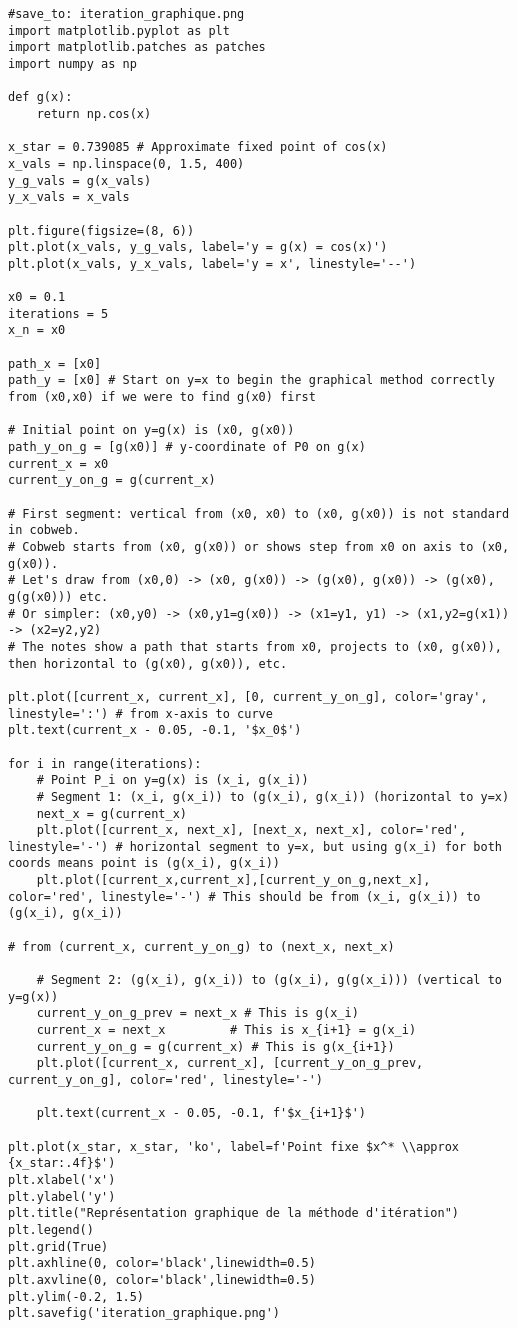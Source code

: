 \begin{verbatim}
#save_to: iteration_graphique.png
import matplotlib.pyplot as plt
import matplotlib.patches as patches
import numpy as np

def g(x):
    return np.cos(x)

x_star = 0.739085 # Approximate fixed point of cos(x)
x_vals = np.linspace(0, 1.5, 400)
y_g_vals = g(x_vals)
y_x_vals = x_vals

plt.figure(figsize=(8, 6))
plt.plot(x_vals, y_g_vals, label='y = g(x) = cos(x)')
plt.plot(x_vals, y_x_vals, label='y = x', linestyle='--')

x0 = 0.1
iterations = 5
x_n = x0

path_x = [x0]
path_y = [x0] # Start on y=x to begin the graphical method correctly from (x0,x0) if we were to find g(x0) first

# Initial point on y=g(x) is (x0, g(x0))
path_y_on_g = [g(x0)] # y-coordinate of P0 on g(x)
current_x = x0
current_y_on_g = g(current_x)

# First segment: vertical from (x0, x0) to (x0, g(x0)) is not standard in cobweb.
# Cobweb starts from (x0, g(x0)) or shows step from x0 on axis to (x0, g(x0)).
# Let's draw from (x0,0) -> (x0, g(x0)) -> (g(x0), g(x0)) -> (g(x0), g(g(x0))) etc.
# Or simpler: (x0,y0) -> (x0,y1=g(x0)) -> (x1=y1, y1) -> (x1,y2=g(x1)) -> (x2=y2,y2)
# The notes show a path that starts from x0, projects to (x0, g(x0)), then horizontal to (g(x0), g(x0)), etc.

plt.plot([current_x, current_x], [0, current_y_on_g], color='gray', linestyle=':') # from x-axis to curve
plt.text(current_x - 0.05, -0.1, '$x_0$')

for i in range(iterations):
    # Point P_i on y=g(x) is (x_i, g(x_i))
    # Segment 1: (x_i, g(x_i)) to (g(x_i), g(x_i)) (horizontal to y=x)
    next_x = g(current_x)
    plt.plot([current_x, next_x], [next_x, next_x], color='red', linestyle='-') # horizontal segment to y=x, but using g(x_i) for both coords means point is (g(x_i), g(x_i))
    plt.plot([current_x,current_x],[current_y_on_g,next_x], color='red', linestyle='-') # This should be from (x_i, g(x_i)) to (g(x_i), g(x_i))
                                                                                         # from (current_x, current_y_on_g) to (next_x, next_x)
    
    # Segment 2: (g(x_i), g(x_i)) to (g(x_i), g(g(x_i))) (vertical to y=g(x))
    current_y_on_g_prev = next_x # This is g(x_i)
    current_x = next_x         # This is x_{i+1} = g(x_i)
    current_y_on_g = g(current_x) # This is g(x_{i+1})
    plt.plot([current_x, current_x], [current_y_on_g_prev, current_y_on_g], color='red', linestyle='-')
    
    plt.text(current_x - 0.05, -0.1, f'$x_{i+1}$')

plt.plot(x_star, x_star, 'ko', label=f'Point fixe $x^* \\approx {x_star:.4f}$')
plt.xlabel('x')
plt.ylabel('y')
plt.title("Représentation graphique de la méthode d'itération")
plt.legend()
plt.grid(True)
plt.axhline(0, color='black',linewidth=0.5)
plt.axvline(0, color='black',linewidth=0.5)
plt.ylim(-0.2, 1.5)
plt.savefig('iteration_graphique.png')
\end{verbatim}


